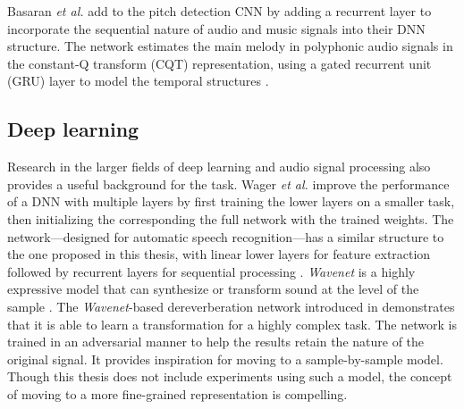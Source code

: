 Basaran {\it et al.} add to the pitch detection CNN by adding a recurrent layer to incorporate the sequential nature of audio and music signals into their DNN structure. The network estimates the main melody in polyphonic audio signals in the constant-Q transform (CQT) representation, using a gated recurrent unit (GRU) layer \cite{chung2014empirical, ChoK2014arxiv} to model the temporal structures \cite{basaranmain}. 

\subsection{Deep learning}
Research in the larger fields of deep learning and audio signal processing also provides a useful background for the task. Wager \textit{et al.} improve the performance of a DNN with multiple layers by first training the lower layers on a smaller task, then initializing the corresponding the full network with the trained weights. The network---designed for automatic speech recognition---has a similar structure to the one proposed in this thesis, with linear lower layers for feature extraction followed by recurrent layers for sequential processing \cite{wager2020fully}.
\textit{Wavenet} is a highly expressive model that can synthesize or transform sound at the level of the sample \cite{oord2016wavenet}. The \textit{Wavenet}-based dereverberation network introduced in \cite{su2020hifi} demonstrates that it is able to learn a transformation for a highly complex task. The network is trained in an adversarial manner \cite{goodfellow2014generative} to help the results retain the nature of the original signal. It provides inspiration for moving to a sample-by-sample model. Though this thesis does not include experiments using such a model, the concept of moving to a more fine-grained representation is compelling.

